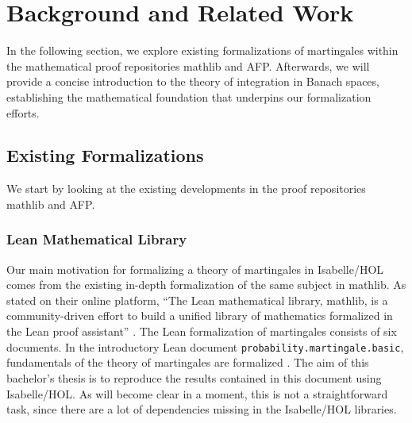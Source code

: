 ﻿%

\chapter{Background and Related Work}\label{chapter:background}

In the following section, we explore existing formalizations of martingales within the mathematical proof repositories \textsf{mathlib} and \textsf{AFP}. Afterwards, we will provide a concise introduction to the theory of integration in Banach spaces, establishing the mathematical foundation that underpins our formalization efforts.

\section{Existing Formalizations}

We start by looking at the existing developments in the proof repositories \textsf{mathlib} and \textsf{AFP}.

\subsection{Lean Mathematical Library}

Our main motivation for formalizing a theory of martingales in Isabelle/HOL comes from the existing in-depth formalization of the same subject in \textsf{mathlib}. As stated on their online platform, ``The Lean mathematical library, \textsf{mathlib}, is a community-driven effort to build a unified library of mathematics formalized in the Lean proof assistant'' \cite{Lean}. The Lean formalization of martingales consists of six documents. In the introductory Lean document \texttt{probability.martingale.basic}, fundamentals of the theory of martingales are formalized \cite{Degenne_Ying_2022}. The aim of this bachelor's thesis is to reproduce the results contained in this document using Isabelle/HOL. As will become clear in a moment, this is not a straightforward task, since there are a lot of dependencies missing in the Isabelle/HOL libraries.

